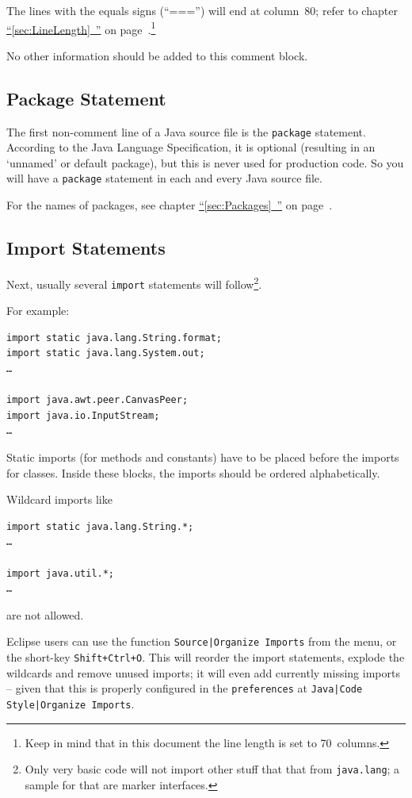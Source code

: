 \documentclass[11pt,a4paper, titlepage, parskip=half, headsepline, footsepline, cleardoublepage=current, headheight=1cm]{scrbook}
\newcommand*{\tqfullvref}[1]{\hyperref[{#1}]{“\ref*{#1}~\nameref*{#1}”} on page~\pageref{#1}}
\begin{document}
The lines with the equals signs (“===”) will end at column~80; refer to chapter \tqfullvref{sec:LineLength}.\footnote{Keep in mind that in this document the line length is set to 70~columns.}

No other information should be added to this comment block.

\subsection{Package Statement}\label{sec:PackageStatement}
The first non-comment line of a Java source file is the \lstinline|package| statement. According to the Java Language Specification\autocite{ORACLE_DOC_LANGUAGE_SPECIFICATION:UnnamedPackages}, it is optional (resulting in an ‘unnamed’ or default package), but this is never used for production code. So you will have a \lstinline|package| statement in each and every Java source file.

For the names of packages, see chapter \tqfullvref{sec:Packages}.

\subsection{Import Statements}\label{sec:ImportStatements}
Next, usually several \lstinline|import| statements will follow\footnote{Only very basic code will not import other stuff that that from \lstinline|java.lang|; a sample for that are marker interfaces.}. 

For example:

\begin{lstlisting}
import static java.lang.String.format;
import static java.lang.System.out;
…

import java.awt.peer.CanvasPeer;
import java.io.InputStream;
…
\end{lstlisting}
Static imports (for methods and constants) have to be placed before the imports for classes. Inside these blocks, the imports should be ordered alphabetically.

Wildcard imports like
\begin{lstlisting}
import static java.lang.String.*;
…

import java.util.*;
…
\end{lstlisting}
are not allowed.

Eclipse users can use the function \verb#Source|Organize Imports# from the menu, or the short-key \verb#Shift+Ctrl+O#. This will reorder the import statements, explode the wildcards and remove unused imports; it will even add currently missing imports – given that this is properly configured in the \verb#preferences# at \verb#Java|Code Style|Organize Imports#.
\end{document}
